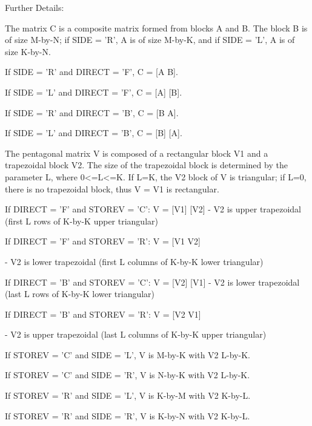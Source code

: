 \begin{DoxyParagraph}{Further Details\+: }
\begin{DoxyVerb}  The matrix C is a composite matrix formed from blocks A and B.
  The block B is of size M-by-N; if SIDE = 'R', A is of size M-by-K, 
  and if SIDE = 'L', A is of size K-by-N.

  If SIDE = 'R' and DIRECT = 'F', C = [A B].

  If SIDE = 'L' and DIRECT = 'F', C = [A] 
                                      [B].

  If SIDE = 'R' and DIRECT = 'B', C = [B A].

  If SIDE = 'L' and DIRECT = 'B', C = [B]
                                      [A]. 

  The pentagonal matrix V is composed of a rectangular block V1 and a 
  trapezoidal block V2.  The size of the trapezoidal block is determined by 
  the parameter L, where 0<=L<=K.  If L=K, the V2 block of V is triangular;
  if L=0, there is no trapezoidal block, thus V = V1 is rectangular.

  If DIRECT = 'F' and STOREV = 'C':  V = [V1]
                                         [V2]
     - V2 is upper trapezoidal (first L rows of K-by-K upper triangular)

  If DIRECT = 'F' and STOREV = 'R':  V = [V1 V2]

     - V2 is lower trapezoidal (first L columns of K-by-K lower triangular)

  If DIRECT = 'B' and STOREV = 'C':  V = [V2]
                                         [V1]
     - V2 is lower trapezoidal (last L rows of K-by-K lower triangular)

  If DIRECT = 'B' and STOREV = 'R':  V = [V2 V1]
    
     - V2 is upper trapezoidal (last L columns of K-by-K upper triangular)

  If STOREV = 'C' and SIDE = 'L', V is M-by-K with V2 L-by-K.

  If STOREV = 'C' and SIDE = 'R', V is N-by-K with V2 L-by-K.

  If STOREV = 'R' and SIDE = 'L', V is K-by-M with V2 K-by-L.

  If STOREV = 'R' and SIDE = 'R', V is K-by-N with V2 K-by-L.\end{DoxyVerb}
 
\end{DoxyParagraph}
